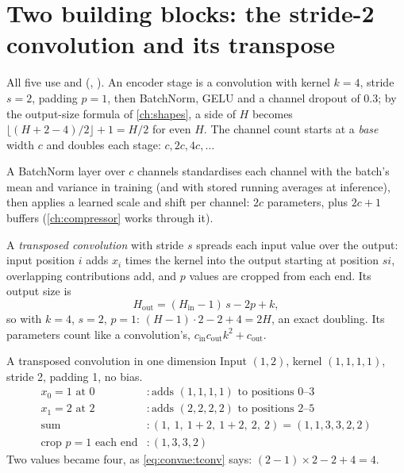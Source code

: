 \section{Two building blocks: the stride-2 convolution and its transpose}\label{sec:convae:blocks}

\begin{sloppypar}
All five use  and  (,
). An encoder stage is a convolution with kernel $k=4$, stride $s=2$, padding
$p=1$, then BatchNorm, GELU and a channel dropout of 0.3; by the output-size formula of \cref{ch:shapes}, a side of
$H$ becomes $\lfloor(H+2-4)/2\rfloor+1=H/2$ for even $H$. The channel count starts at a \emph{base} width $c$ and
doubles each stage: $c, 2c, 4c, \dots$
\end{sloppypar}

\begin{definition}
A BatchNorm layer over $c$ channels standardises each channel with the batch's mean and variance in
training (and with stored running averages at inference), then applies a learned scale and shift per channel: $2c$
parameters, plus $2c+1$ buffers (\cref{ch:compressor} works through it).
\end{definition}

\begin{definition}
A \emph{transposed convolution} with stride $s$ spreads each input value over the
output: input position $i$ adds $x_i$ times the kernel into the output starting at position $si$, overlapping
contributions add, and $p$ values are cropped from each end. Its output size is
\begin{equation}\label{eq:convae:tconv}
H_\text{out} = (H_\text{in}-1)\,s-2p+k ,
\end{equation}
so with $k=4$, $s=2$, $p=1$: $(H-1)\cdot2-2+4=2H$, an exact doubling. Its parameters count like a convolution's,
$c_\text{in}c_\text{out}k^2+c_\text{out}$.
\end{definition}

\begin{worked}[label={we:convae:tconv}]{A transposed convolution in one dimension}
Input $(1,2)$, kernel $(1,1,1,1)$, stride 2, padding 1, no bias.
\begin{align*}
x_0=1 \text{ at } 0 &: \text{adds } (1,1,1,1) \text{ to positions } 0\text{--}3\\
x_1=2 \text{ at } 2 &: \text{adds } (2,2,2,2) \text{ to positions } 2\text{--}5\\
\text{sum} &: (1,\ 1,\ 1+2,\ 1+2,\ 2,\ 2) = (1,1,3,3,2,2)\\
\text{crop } p=1 \text{ each end} &: (1,3,3,2)
\end{align*}
Two values became four, as \cref{eq:convae:tconv} says: $(2-1)\times2-2+4=4$.
\end{worked}


